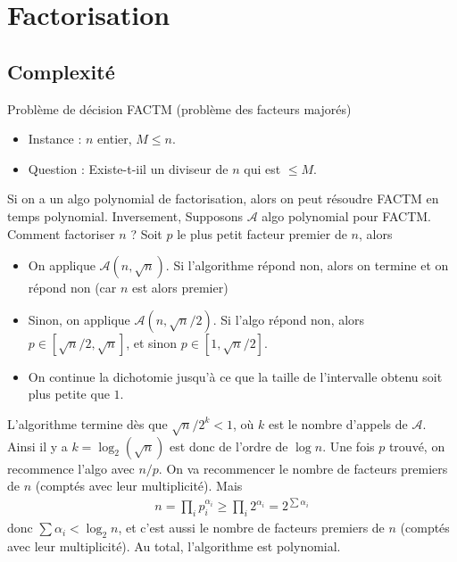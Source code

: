     \section{Factorisation}
        \subsection{Complexité}
            Problème de décision FACTM (problème des facteurs majorés)
            \begin{itemize}
                \item Instance : $n$ entier, $M \leq n$.
                \item Question : Existe-t-iil un diviseur de $n$ qui est $\leq M$.
            \end{itemize}
            Si on a un algo polynomial de factorisation, alors on peut résoudre FACTM en temps polynomial. Inversement, Supposons $\mathcal{A}$ algo polynomial pour FACTM. Comment factoriser $n$ ? Soit $p$ le plus petit facteur premier de $n$, alors
            \begin{itemize}
                \item On applique $\mathcal{A}(n, \sqrt{n})$. Si l'algorithme répond non, alors on termine et on répond non (car $n$ est alors premier)
                \item Sinon, on applique $\mathcal{A}(n, \sqrt{n}/2)$. Si l'algo répond non, alors $p \in [\sqrt{n}/2, \sqrt{n}]$, et sinon $p \in [1, \sqrt{n}/2]$.
                \item On continue la dichotomie jusqu'à ce que la taille de l'intervalle obtenu soit plus petite que $1$.
            \end{itemize}
            L'algorithme termine dès que $\sqrt{n}/2^k <1$, où $k$ est le nombre d'appels de $\mathcal{A}$. Ainsi il y a $k = \log_2(\sqrt{n})$ est donc de l'ordre de $\log n$. Une fois $p$ trouvé, on recommence l'algo avec $n/p$. On va recommencer le nombre de facteurs premiers de $n$ (comptés avec leur multiplicité). Mais
            \begin{align*}
                n = \prod_i p_i^{\alpha_i} \geq \prod_i 2^{\alpha_i} = 2^{\sum \alpha_i}
            \end{align*}
            donc $\sum \alpha_i < \log_2 n$, et c'est aussi le nombre de facteurs premiers de $n$ (comptés avec leur multiplicité). Au total, l'algorithme est polynomial.

